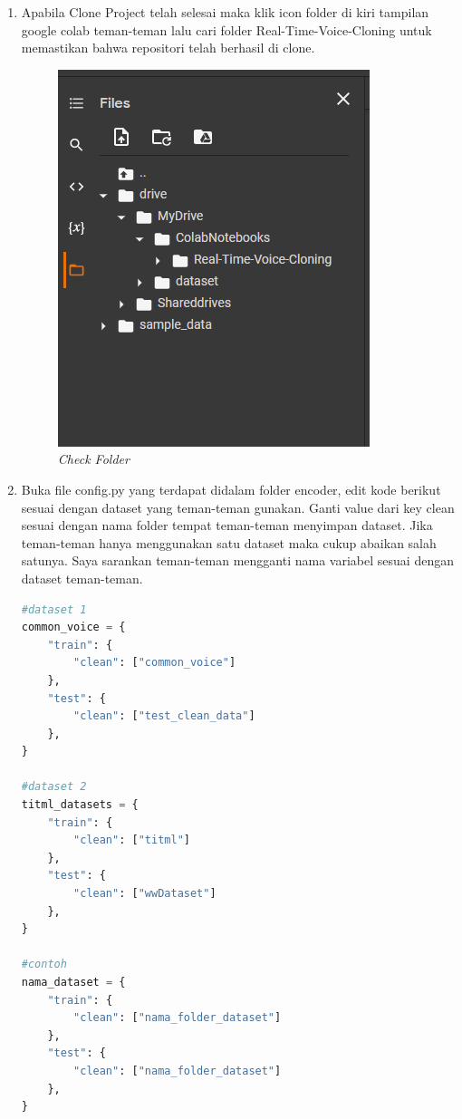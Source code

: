 \begin{enumerate}
\item Apabila Clone Project telah selesai maka klik icon folder di kiri tampilan google colab teman-teman lalu cari folder Real-Time-Voice-Cloning untuk memastikan bahwa repositori telah berhasil di clone.
\begin{figure}[H]
    \centering
    \includegraphics[scale=0.5]{figures/colab7}
    \caption{\textit{Check Folder}}
    \label{clab7}
\end{figure}

\item Buka file config.py yang terdapat didalam folder encoder, edit kode berikut sesuai dengan dataset yang teman-teman gunakan. Ganti value dari key clean sesuai dengan nama folder tempat teman-teman menyimpan dataset. Jika teman-teman hanya menggunakan satu dataset maka cukup abaikan salah satunya. Saya sarankan teman-teman mengganti nama variabel sesuai dengan dataset teman-teman.

\begin{lstlisting}[language=Python, caption=Config Dataset]
#dataset 1
common_voice = {
    "train": {
        "clean": ["common_voice"]
    },
    "test": {
        "clean": ["test_clean_data"]
    },
}

#dataset 2
titml_datasets = {
    "train": {
        "clean": ["titml"]
    },
    "test": {
        "clean": ["wwDataset"]
    },
}

#contoh
nama_dataset = {
    "train": {
        "clean": ["nama_folder_dataset"]
    },
    "test": {
        "clean": ["nama_folder_dataset"]
    },
}
\end{lstlisting}


\end{enumerate}
